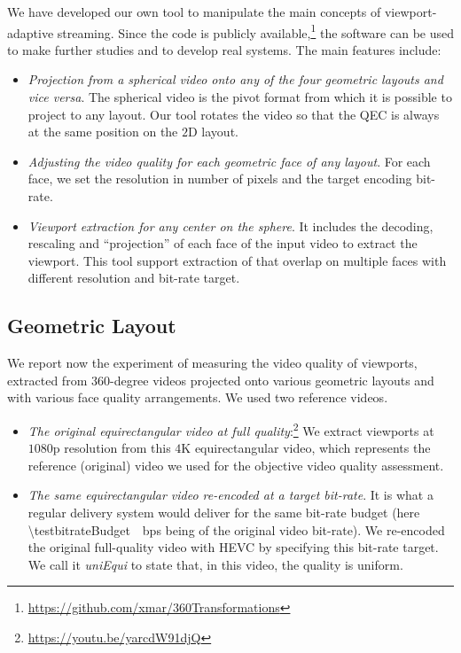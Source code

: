 We have developed our own tool to manipulate the main
concepts of viewport-adaptive streaming. Since the code is publicly
available,\footnote{\url{https://github.com/xmar/360Transformations}}
the software can be used to make further studies and to
develop real systems. The main features include:
\begin{itemize}
  \item \emph{Projection from a spherical video onto any of the four geometric
layouts and vice versa}. The spherical video is the pivot format from
which it is possible to project to any layout.
Our tool rotates the
video so that the \ac{QEC} is always at the same position on
the $2$D layout.

  \item \emph{Adjusting the video quality for each
geometric face of any layout}. For each face, we set the resolution in
number of pixels and the target encoding bit-rate.

  \item \emph{Viewport extraction for any
\FoV{} center on the sphere}. It includes the decoding, rescaling
and ``projection'' of each face of the input video to extract the
viewport. This tool support extraction of \FoV{} that overlap on
multiple faces with different resolution and bit-rate target.
\end{itemize}

\subsection{Geometric Layout}

We report now the experiment of measuring the video quality of
viewports, extracted from $360$-degree videos
projected onto various geometric layouts and with various face quality
arrangements. We used two reference videos.
\begin{itemize}
   \item \emph{The original equirectangular video at full quality}:\footnote{\url{https://youtu.be/yarcdW91djQ}}
	We extract viewports at $1080$p resolution from this $4$K
   equirectangular video, which represents the reference (original)
   video we used for the objective video quality assessment.

   \item \emph{The same equirectangular video re-encoded at a target bit-rate}.
   It is what a regular delivery system would deliver for the same bit-rate budget (here \SI{\testbitrateBudget}{\mega
   bps} being \testbitrateBudgetPercentage{} of the original video bit-rate).
   We re-encoded the original full-quality video with \ac{HEVC}
   by specifying this bit-rate target. We call it \emph{uniEqui} to
   state that, in this video, the quality is uniform.
\end{itemize}

